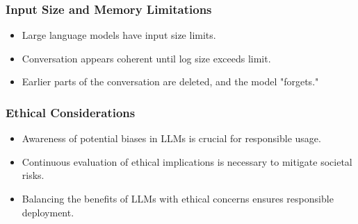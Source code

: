 \begin{frame}[fragile]\frametitle{Input Size and Memory Limitations}
\begin{itemize}
    \item Large language models have input size limits.
    \item Conversation appears coherent until log size exceeds limit.
    \item Earlier parts of the conversation are deleted, and the model "forgets."
\end{itemize}
\end{frame}




\begin{frame}[fragile]
  \frametitle{Ethical Considerations}

  \begin{itemize}
    \item Awareness of potential biases in LLMs is crucial for responsible usage.
    \item Continuous evaluation of ethical implications is necessary to mitigate societal risks.
    \item Balancing the benefits of LLMs with ethical concerns ensures responsible deployment.

  \end{itemize}


\end{frame}


